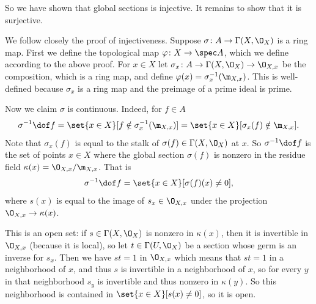 So we have shown that global sections is injective.
It remains to show that it is surjective.

We follow closely the proof of injectiveness.
Suppose $\sigma\colon A\to\Gamma(X,\O_X)$ is a ring map.
First we define the topological map $\phi\colon X\to\spec A$, which we define according to the above proof.
For $x\in X$ let $\sigma_x\colon A\to\Gamma(X,\O_X)\to\O_{X,x}$ be the composition, which is a ring map,
and define $\phi(x)=\sigma_x^{-1}(\m_{X,x})$.
This is well-defined because $\sigma_x$ is a ring map and the preimage of a prime ideal is prime.

Now we claim $\sigma$ is continuous.
Indeed, for $f\in A$
$$ \sigma^{-1}\dof f = \set{x\in X}[f\notin\sigma_x^{-1}(\m_{X,x})] =
\set{x\in X}[\sigma_x(f)\notin\m_{X,x}] . $$
Note that $\sigma_x(f)$ is equal to the stalk of $\sigma(f)\in\Gamma(X,\O_X)$ at $x$.
So $\sigma^{-1}\dof f$ is the set of points $x\in X$ where the global section $\sigma(f)$ is nonzero
in the residue field $\kappa(x)=\O_{X,x}/\m_{X,x}$.
That is
$$ \sigma^{-1}\dof f = \set{x\in X}[\sigma(f)(x)\neq0] , $$
where $s(x)$ is equal to the image of $s_x\in\O_{X,x}$ under the projection $\O_{X,x}\to\kappa(x)$.

This is an open set: if $s\in\Gamma(X,\O_X)$ is nonzero in $\kappa(x)$, then it is invertible in
$\O_{X,x}$ (because it is local), so let $t\in\Gamma(U,\O_X)$ be a section whose germ is an inverse for
$s_x$.
Then we have $st=1$ in $\O_{X,x}$ which means that $st=1$ in a neighborhood of $x$, and thus $s$ is
invertible in a neighborhood of $x$, so for every $y$ in that neighborhood $s_y$ is invertible and thus
nonzero in $\kappa(y)$.
So this neighborhood is contained in $\set{x\in X}[s(x)\neq0]$, so it is open.

